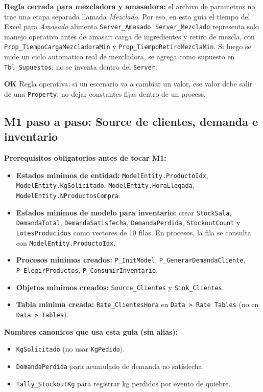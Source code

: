 \documentclass[11pt]{article}
\newcommand{\simio}[1]{\texttt{#1}}
\newcommand{\tabla}[1]{\texttt{#1}}
\newcommand{\state}[1]{\texttt{#1}}
\newcommand{\proc}[1]{\texttt{#1}}
\newcommand{\ok}{\textcolor{verdeok}{\textbf{OK}}}
\begin{document}
\textbf{Regla cerrada para mezcladora y amasadora:} el archivo de parametros no trae una etapa separada llamada \textit{Mezclado}. Por eso, en esta guia el tiempo del Excel para \textit{Amasado} alimenta \simio{Server\_Amasado}. \simio{Server\_Mezclado} representa solo manejo operativo antes de amasar: carga de ingredientes y retiro de mezcla, con \state{Prop\_TiempoCargaMezcladoraMin} y \state{Prop\_TiempoRetiroMezclaMin}. Si luego se mide un ciclo automatico real de mezcladora, se agrega como supuesto en \tabla{Tbl\_Supuestos}; no se inventa dentro del \simio{Server}.

\ok{} Regla operativa: si un escenario va a cambiar un valor, ese valor debe salir de una \simio{Property}; no dejar constantes fijas dentro de un process.


\subsection{M1 paso a paso: Source de clientes, demanda e inventario}

\textbf{Prerequisitos obligatorios antes de tocar M1:}
\begin{itemize}
  \item \textbf{Estados minimos de entidad:} \state{ModelEntity.ProductoIdx}, \state{ModelEntity.KgSolicitado}, \state{ModelEntity.HoraLlegada}, \state{ModelEntity.NProductosCompra}.
  \item \textbf{Estados minimos de modelo para inventario:} crear \state{StockSala}, \state{DemandaTotal}, \state{DemandaSatisfecha}, \state{DemandaPerdida}, \state{StockoutCount} y \state{LotesProducidos} como vectores de 10 filas. En procesos, la fila se consulta con \state{ModelEntity.ProductoIdx}.
  \item \textbf{Procesos minimos creados:} \proc{P\_InitModel}, \proc{P\_GenerarDemandaCliente}, \proc{P\_ElegirProductos}, \proc{P\_ConsumirInventario}.
  \item \textbf{Objetos minimos creados:} \simio{Source\_Clientes} y \simio{Sink\_Clientes}.
  \item \textbf{Tabla minima creada:} \tabla{Rate\_ClientesHora} en \simio{Data > Rate Tables} (no en \simio{Data > Tables}).
\end{itemize}

\textbf{Nombres canonicos que usa esta guia (sin alias):}
\begin{itemize}
  \item \state{KgSolicitado} (no usar \state{KgPedido}).
  \item \state{DemandaPerdida} para acumulado de demanda no satisfecha.
  \item \simio{Tally\_StockoutKg} para registrar kg perdidos por evento de quiebre.
\end{itemize}
\end{document}
